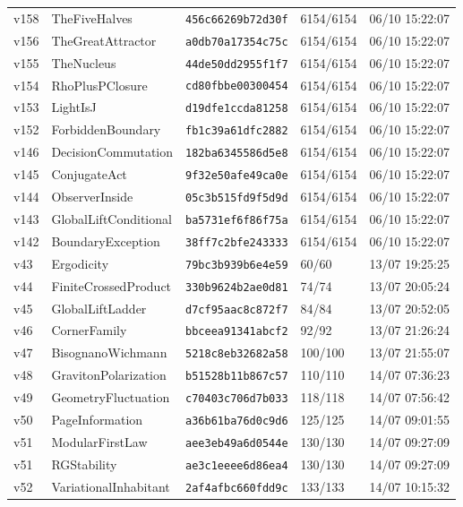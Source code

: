 \documentclass[11pt]{article}
\theoremstyle{definition}\newtheorem{deriv}{Derivação}
\begin{document}
{\begin{longtable}{@{}lllll@{}}
v158 & TheFiveHalves & \texttt{456c66269b72d30f} & 6154/6154 & 06/10 15:22:07 \\
v156 & TheGreatAttractor & \texttt{a0db70a17354c75c} & 6154/6154 & 06/10 15:22:07 \\
v155 & TheNucleus & \texttt{44de50dd2955f1f7} & 6154/6154 & 06/10 15:22:07 \\
v154 & RhoPlusPClosure & \texttt{cd80fbbe00300454} & 6154/6154 & 06/10 15:22:07 \\
v153 & LightIsJ & \texttt{d19dfe1ccda81258} & 6154/6154 & 06/10 15:22:07 \\
v152 & ForbiddenBoundary & \texttt{fb1c39a61dfc2882} & 6154/6154 & 06/10 15:22:07 \\
v146 & DecisionCommutation & \texttt{182ba6345586d5e8} & 6154/6154 & 06/10 15:22:07 \\
v145 & ConjugateAct & \texttt{9f32e50afe49ca0e} & 6154/6154 & 06/10 15:22:07 \\
v144 & ObserverInside & \texttt{05c3b515fd9f5d9d} & 6154/6154 & 06/10 15:22:07 \\
v143 & GlobalLiftConditional & \texttt{ba5731ef6f86f75a} & 6154/6154 & 06/10 15:22:07 \\
v142 & BoundaryException & \texttt{38ff7c2bfe243333} & 6154/6154 & 06/10 15:22:07 \\
v43 & Ergodicity & \texttt{79bc3b939b6e4e59} & 60/60 & 13/07 19:25:25 \\
v44 & FiniteCrossedProduct & \texttt{330b9624b2ae0d81} & 74/74 & 13/07 20:05:24 \\
v45 & GlobalLiftLadder & \texttt{d7cf95aac8c872f7} & 84/84 & 13/07 20:52:05 \\
v46 & CornerFamily & \texttt{bbceea91341abcf2} & 92/92 & 13/07 21:26:24 \\
v47 & BisognanoWichmann & \texttt{5218c8eb32682a58} & 100/100 & 13/07 21:55:07 \\
v48 & GravitonPolarization & \texttt{b51528b11b867c57} & 110/110 & 14/07 07:36:23 \\
v49 & GeometryFluctuation & \texttt{c70403c706d7b033} & 118/118 & 14/07 07:56:42 \\
v50 & PageInformation & \texttt{a36b61ba76d0c9d6} & 125/125 & 14/07 09:01:55 \\
v51 & ModularFirstLaw & \texttt{aee3eb49a6d0544e} & 130/130 & 14/07 09:27:09 \\
v51 & RGStability & \texttt{ae3c1eeee6d86ea4} & 130/130 & 14/07 09:27:09 \\
v52 & VariationalInhabitant & \texttt{2af4afbc660fdd9c} & 133/133 & 14/07 10:15:32 \\

\end{longtable}}
\end{document}
